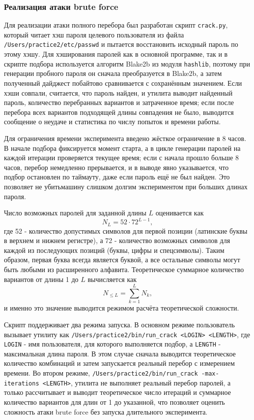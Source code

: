 \documentclass[areasetadvanced]{scrartcl}
\begin{document}
\subsubsection{Реализация атаки brute force}

Для реализации атаки полного перебора был разработан скрипт \texttt{crack.py}, который читает хэш пароля целевого пользователя из файла \texttt{/Users/practice2/etc/passwd} и пытается восстановить исходный пароль по этому хэшу. Для хэширования паролей как в основной программе, так и в скрипте подбора используется алгоритм Blake2b из модуля \texttt{hashlib}, поэтому при генерации пробного пароля он сначала преобразуется в Blake2b, а затем полученный дайджест побайтово сравнивается с сохранённым значением. Если хэши совпали, считается, что пароль найден, и утилита выводит найденный пароль, количество перебранных вариантов и затраченное время; если после перебора всех вариантов подходящей длины совпадения не было, выводится сообщение о неудаче и статистика по числу попыток и времени работы.

Для ограничения времени эксперимента введено жёсткое ограничение в 8 часов. В начале подбора фиксируется момент старта, а в цикле генерации паролей на каждой итерации проверяется текущее время; если с начала прошло больше 8 часов, перебор немедленно прерывается, и в выводе явно указывается, что подбор остановлен по таймауту, даже если пароль ещё не был найден. Это позволяет не \guillemetleft убить\guillemetright машину слишком долгим экспериментом при больших длинах пароля.

Число возможных паролей для заданной длины $L$ оценивается как
\[
N_L = 52 \cdot 72^{L-1},
\]
где 52 - количество допустимых символов для первой позиции (латинские буквы в верхнем и нижнем регистре), а 72 - количество возможных символов для каждой из последующих позиций (буквы, цифры и спецсимволы). Таким образом, первая буква всегда является буквой, а все остальные символы могут быть любыми из расширенного алфавита. Теоретическое суммарное количество вариантов от длины 1 до $L$ вычисляется как
\[
N_{\leq L} = \sum_{k=1}^{L} N_k,
\]
и именно это значение выводится режимом расчёта теоретической сложности.

Скрипт поддерживает два режима запуска. В основном режиме пользователь вызывает утилиту как \texttt{/Users/practice2/bin/run\_crack <LOGIN> <LENGTH>}, где \texttt{LOGIN} - имя пользователя, для которого выполняется подбор, а \texttt{LENGTH} - максимальная длина пароля. В этом случае сначала выводится теоретическое количество комбинаций и затем запускается реальный перебор с измерением времени. Во втором режиме, \texttt{/Users/practice2/bin/run\_crack -max-iterations <LENGTH>}, утилита не выполняет реальный перебор паролей, а только рассчитывает и выводит теоретическое число итераций и суммарное количество вариантов для длин от 1 до указанной, что позволяет оценить сложность атаки brute force без запуска длительного эксперимента.
\end{document}
